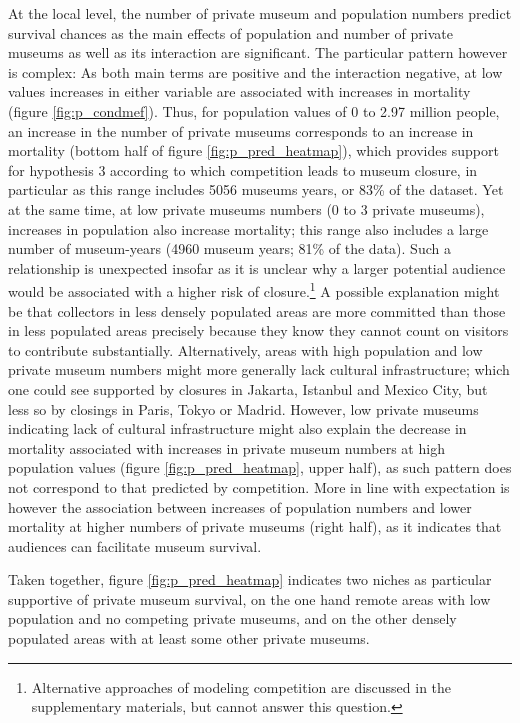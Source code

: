 \documentclass[12pt]{article}
\begin{document}
At the local level, the number of private museum and population numbers predict survival chances as the main effects of population and number of private museums as well as its interaction are significant.
The particular pattern however is complex:
As both main terms are positive and the interaction negative, at low values increases in either variable are associated with increases in mortality (figure \ref{fig:p_condmef}).
Thus, for population values of 0 to 2.97 million people, an increase in the number of private museums corresponds to an increase in mortality (bottom half of figure \ref{fig:p_pred_heatmap}), which provides support for hypothesis 3 according to which competition leads to museum closure, in particular as this range includes 5056 museums years, or 83\% of the dataset. 
Yet at the same time, at low private museums numbers (0 to 3 private museums), increases in population also increase mortality; this range also includes a large number of museum-years (4960 museum years; 81\% of the data).
Such a relationship is unexpected insofar as it is unclear why a larger potential audience would be associated with a higher risk of closure.\footnote{Alternative approaches of modeling competition are discussed in the supplementary materials, but cannot answer this question.}
A possible explanation might be that collectors in less densely populated areas are more committed than those in less populated areas precisely because they know they cannot count on visitors to contribute substantially.
Alternatively, areas with high population and low private museum numbers might more generally lack cultural infrastructure; which one could see supported by closures in Jakarta, Istanbul and Mexico City, but less so by closings in Paris, Tokyo or Madrid.
However, low private museums indicating lack of cultural infrastructure might also explain the decrease in mortality associated with increases in private museum numbers at high population values (figure \ref{fig:p_pred_heatmap}, upper half), as such pattern does not correspond to that predicted by competition.
More in line with expectation is however the association between increases of population numbers and lower mortality at higher numbers of private museums (right half), as it indicates that audiences can facilitate museum survival.


Taken together, figure \ref{fig:p_pred_heatmap} indicates two niches as particular supportive of private museum survival, on the one hand remote areas with low population and no competing private museums, and on the other densely populated areas with at least some other private museums.
\end{document}
